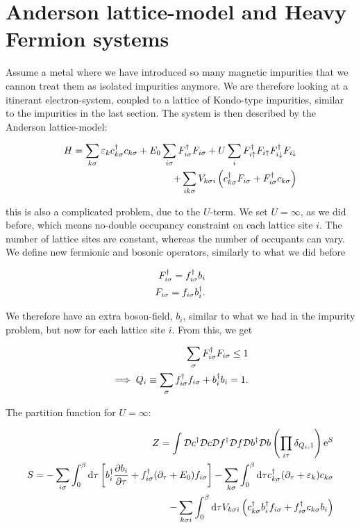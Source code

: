 
\section{Anderson lattice-model and Heavy Fermion systems}

Assume a metal where we have introduced so many magnetic impurities that we cannon treat them as isolated impurities anymore. We are therefore looking at a itinerant electron-system, coupled to a lattice of Kondo-type impurities, similar to the impurities in the last section. The system is then described by the Anderson lattice-model: 

\begin{align*}
    H = \sum_{k\sigma} \varepsilon_k c^{\dagger}_{k\sigma}c_{k\sigma} + E_0 \sum_{i\sigma} F^{\dagger}_{i\sigma} F_{i\sigma} + U\sum_i F^{\dagger}_{i \uparrow} F_{i \uparrow} F^{\dagger}_{i \downarrow} F_{i \downarrow} \\ 
    + \sum_{ik\sigma} V_{k\sigma i} \left(c^{\dagger}_{k\sigma}F_{i\sigma} + F^{\dagger}_{i\sigma}c_{k\sigma}\right)
\end{align*}

this is also a complicated problem, due to the $U$-term. We set $U = \infty$, as we did before, which means no-double occupancy constraint on each lattice site $i$. The number of lattice sites are constant, whereas the number of occupants can vary. We define new fermionic and bosonic operators, similarly to what we did before 

\begin{align*}
    F^{\dagger}_{i\sigma} = f^{\dagger}_{i\sigma}b_i \\ 
    F_{i\sigma} = f_{i\sigma} b^{\dagger}_i. 
\end{align*}

We therefore have an extra boson-field, $b_i$, similar to what we had in the impurity problem, but now for each lattice site $i$. From this, we get 

\begin{align*}
    \sum_\sigma F^{\dagger}_{i\sigma} F_{i\sigma} \leq 1 \\
    \implies Q_i \equiv \sum_\sigma f^{\dagger}_{i\sigma}f_{i\sigma} + b^{\dagger}_i  b_i = 1. 
\end{align*}

The partition function for $U = \infty$: 

\begin{align*}
    Z = \int \mathcal{D} c^{\dagger} \mathcal{D} c \mathcal{D} f^{\dagger} \mathcal{D} f \mathcal{D} b^{\dagger} \mathcal{D} b \left(\prod_{i\tau} \delta_{Q_i, 1} \right) \mathrm{e}^S \\ 
    S = -\sum_{i\sigma} \int_{0}^{\beta} \dd \tau \left[ b^{\dagger}_i \pdv{b_i}{\tau} + f^{\dagger}_{i\sigma}(\partial_\tau + E_0)f_{i\sigma} \right] - \sum_{k\sigma} \int_{0}^{\beta} \dd \tau c^{\dagger}_{k\sigma}(\partial_\tau + \varepsilon_k)c_{k\sigma} \\ 
    - \sum_{k\sigma i} \int_{0}^{\beta} \dd \tau V_{k\sigma i}\left( c^{\dagger}_{k\sigma} b^{\dagger}_i f_{i\sigma} + f^{\dagger}_{i\sigma}c_{k\sigma} b_i \right) 
\end{align*}

